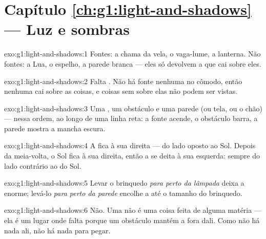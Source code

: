 \section*{Capítulo \ref{ch:g1:light-and-shadows} --- Luz e sombras}

\begin{solution}{exo:g1:light-and-shadows:1}
Fontes: a chama da vela, o vaga-lume, a lanterna. Não fontes: a Lua,
o espelho, a parede branca --- eles só devolvem a  que cai sobre
eles.
\end{solution}

\begin{solution}{exo:g1:light-and-shadows:2}
Falta . Não há fonte nenhuma no cômodo, então nenhuma  cai
sobre as coisas, e coisas sem  sobre elas não podem ser vistas.
\end{solution}

\begin{solution}{exo:g1:light-and-shadows:3}
Uma , um obstáculo e uma parede (ou tela, ou o chão) ---
nessa ordem, ao longo de uma linha reta: a fonte acende, o obstáculo
barra, a parede mostra a mancha escura.
\end{solution}

\begin{solution}{exo:g1:light-and-shadows:4}
A  fica à sua direita --- do lado oposto ao Sol. Depois da
meia-volta, o Sol fica à sua direita, então a  se deita à sua
esquerda: sempre do lado contrário ao do Sol.
\end{solution}

\begin{solution}{exo:g1:light-and-shadows:5}
Levar o brinquedo \emph{para perto da lâmpada} deixa a 
enorme; levá-lo \emph{para perto da parede} encolhe a  até o
tamanho do brinquedo.
\end{solution}

\begin{solution}{exo:g1:light-and-shadows:6}
Não. Uma  não é uma coisa feita de alguma matéria --- ela é um
lugar onde falta  porque um obstáculo mantém a  fora dali. Como
não há nada ali, não há nada para pegar.
\end{solution}

